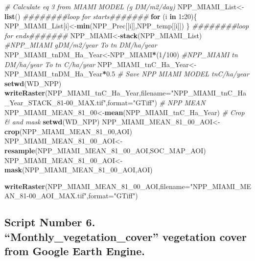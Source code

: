 \documentclass[
  10pt,
  b5paper,
]{book}
\newenvironment{Shaded}{\begin{snugshade}}{\end{snugshade}}
\newcommand{\CommentTok}[1]{\textcolor[rgb]{0.56,0.35,0.01}{\textit{#1}}}
\newcommand{\ControlFlowTok}[1]{\textcolor[rgb]{0.13,0.29,0.53}{\textbf{#1}}}
\newcommand{\DataTypeTok}[1]{\textcolor[rgb]{0.13,0.29,0.53}{#1}}
\newcommand{\DecValTok}[1]{\textcolor[rgb]{0.00,0.00,0.81}{#1}}
\newcommand{\FloatTok}[1]{\textcolor[rgb]{0.00,0.00,0.81}{#1}}
\newcommand{\KeywordTok}[1]{\textcolor[rgb]{0.13,0.29,0.53}{\textbf{#1}}}
\newcommand{\NormalTok}[1]{#1}
\newcommand{\OperatorTok}[1]{\textcolor[rgb]{0.81,0.36,0.00}{\textbf{#1}}}
\newcommand{\StringTok}[1]{\textcolor[rgb]{0.31,0.60,0.02}{#1}}
\begin{document}
\begin{Shaded}
\begin{Highlighting}[]
\CommentTok{# Calculate eq 3 from MIAMI MODEL (g DM/m2/day)}
\NormalTok{NPP_MIAMI_List<-}\KeywordTok{list}\NormalTok{()}
\CommentTok{########loop for starts#######}
\ControlFlowTok{for}\NormalTok{ (i }\ControlFlowTok{in} \DecValTok{1}\OperatorTok{:}\DecValTok{20}\NormalTok{)\{}
\NormalTok{NPP_MIAMI_List[i]<-}\KeywordTok{min}\NormalTok{(NPP_Prec[[i]],NPP_temp[[i]])}
\NormalTok{\}}
\CommentTok{########loop for ends#######}
\NormalTok{NPP_MIAMI<-}\KeywordTok{stack}\NormalTok{(NPP_MIAMI_List)}
\CommentTok{#NPP_MIAMI gDM/m2/year To tn DM/ha/year}
\NormalTok{NPP_MIAMI_tnDM_Ha_Year<-NPP_MIAMI}\OperatorTok{*}\NormalTok{(}\DecValTok{1}\OperatorTok{/}\DecValTok{100}\NormalTok{)}
\CommentTok{#NPP_MIAMI tn DM/ha/year To tn C/ha/year}
\NormalTok{NPP_MIAMI_tnC_Ha_Year<-NPP_MIAMI_tnDM_Ha_Year}\OperatorTok{*}\FloatTok{0.5}
\CommentTok{# Save NPP MIAMI MODEL tnC/ha/year}
\KeywordTok{setwd}\NormalTok{(WD_NPP)}
\KeywordTok{writeRaster}\NormalTok{(NPP_MIAMI_tnC_Ha_Year,}\DataTypeTok{filename=}\StringTok{"NPP_MIAMI_tnC_Ha_Year_STACK_81-00_MAX.tif"}\NormalTok{,}\DataTypeTok{format=}\StringTok{"GTiff"}\NormalTok{)}
\CommentTok{# NPP MEAN}
\NormalTok{NPP_MIAMI_MEAN_}\DecValTok{81}\NormalTok{_}\DecValTok{00}\NormalTok{<-}\KeywordTok{mean}\NormalTok{(NPP_MIAMI_tnC_Ha_Year)}
\CommentTok{# Crop & and mask}
\KeywordTok{setwd}\NormalTok{(WD_NPP)}
\NormalTok{NPP_MIAMI_MEAN_}\DecValTok{81}\NormalTok{_}\DecValTok{00}\NormalTok{_AOI<-}\KeywordTok{crop}\NormalTok{(NPP_MIAMI_MEAN_}\DecValTok{81}\NormalTok{_}\DecValTok{00}\NormalTok{,AOI)}
\NormalTok{NPP_MIAMI_MEAN_}\DecValTok{81}\NormalTok{_}\DecValTok{00}\NormalTok{_AOI<-}\KeywordTok{resample}\NormalTok{(NPP_MIAMI_MEAN_}\DecValTok{81}\NormalTok{_}\DecValTok{00}\NormalTok{_AOI,SOC_MAP_AOI)}
\NormalTok{NPP_MIAMI_MEAN_}\DecValTok{81}\NormalTok{_}\DecValTok{00}\NormalTok{_AOI<-}\KeywordTok{mask}\NormalTok{(NPP_MIAMI_MEAN_}\DecValTok{81}\NormalTok{_}\DecValTok{00}\NormalTok{_AOI,AOI)}

\KeywordTok{writeRaster}\NormalTok{(NPP_MIAMI_MEAN_}\DecValTok{81}\NormalTok{_}\DecValTok{00}\NormalTok{_AOI,}\DataTypeTok{filename=}\StringTok{"NPP_MIAMI_MEAN_81-00_AOI_MAX.tif"}\NormalTok{,}\DataTypeTok{format=}\StringTok{"GTiff"}\NormalTok{)}
\end{Highlighting}
\end{Shaded}

\hypertarget{script-number-6.-monthly_vegetation_cover-vegetation-cover-from-google-earth-engine.}{%
\subsection{Script Number 6. ``Monthly\_vegetation\_cover'' vegetation cover from Google Earth Engine.}\label{script-number-6.-monthly_vegetation_cover-vegetation-cover-from-google-earth-engine.}}
\end{document}

